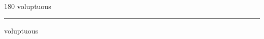 
\begin{frame}
\begin{center}
\begin{turn}{180}
{\fontsize{2.5cm}{1em}\selectfont voluptuous}
\end{turn}
\vspace{1em}\par  
\hrule
\vspace{1em}\par  
{\fontsize{2.5cm}{1em}\selectfont voluptuous}
\end{center}
\end{frame}
